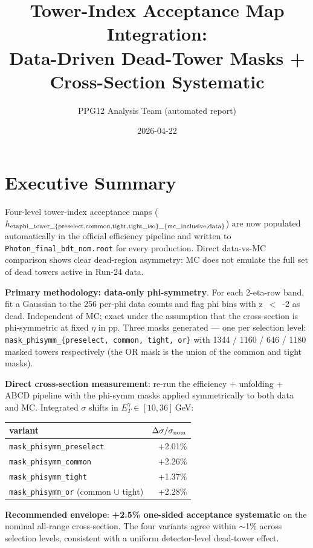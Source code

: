 \documentclass[11pt,a4paper]{article}
\title{Tower-Index Acceptance Map Integration:\\
\large Data-Driven Dead-Tower Masks + Cross-Section Systematic}
\author{PPG12 Analysis Team (automated report)}
\date{2026-04-22}
\newcommand{\etg}{\ensuremath{E_T^\gamma}}
\begin{document}
\maketitle

\section*{Executive Summary}

Four-level tower-index acceptance maps
($h_{\rm etaphi\_tower\_\{preselect,common,tight,tight\_iso\}\_\{mc\_inclusive,data\}}$)
are now populated automatically in the official efficiency pipeline
and written to \texttt{Photon\_final\_bdt\_nom.root} for every
production. Direct data-vs-MC comparison shows clear dead-region
asymmetry: MC does not emulate the full set of dead towers active in
Run-24 data.

\textbf{Primary methodology: data-only phi-symmetry}. For each 2-eta-row
band, fit a Gaussian to the 256 per-phi data counts and flag phi bins
with z~$<$~-2 as dead. Independent of MC; exact under the assumption
that the cross-section is phi-symmetric at fixed $\eta$ in pp. Three
masks generated --- one per selection level:
\texttt{mask\_phisymm\_\{preselect, common, tight, or\}} with 1344 /
1160 / 646 / 1180 masked towers respectively (the OR mask is the
union of the common and tight masks).

\textbf{Direct cross-section measurement}: re-run the efficiency +
unfolding + ABCD pipeline with the phi-symm masks applied
symmetrically to both data and MC. Integrated $\sigma$ shifts in
$\etg \in [10, 36]$\,GeV:

\begin{center}
\begin{tabular}{lr}
\toprule
variant & $\Delta\sigma / \sigma_{\rm nom}$ \\
\midrule
\texttt{mask\_phisymm\_preselect}              & +2.01\% \\
\texttt{mask\_phisymm\_common}                 & +2.26\% \\
\texttt{mask\_phisymm\_tight}                  & +1.37\% \\
\texttt{mask\_phisymm\_or} (common $\cup$ tight) & +2.28\% \\
\bottomrule
\end{tabular}
\end{center}

\textbf{Recommended envelope}: \textbf{+2.5\% one-sided acceptance
systematic} on the nominal all-range cross-section. The four variants
agree within $\sim$1\% across selection levels, consistent with a
uniform detector-level dead-tower effect.
\end{document}
